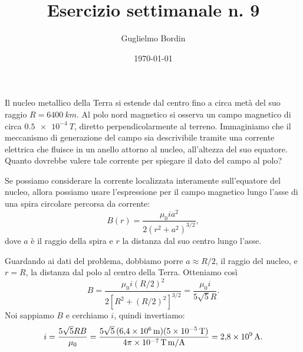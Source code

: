 \documentclass[10pt]{gulartcl}
\title{Esercizio settimanale n. 9}
\author{Guglielmo Bordin}
\date{\today}
\begin{document}
\maketitle 

\noindent
Il nucleo metallico della Terra si estende dal centro fino a circa metà del
suo raggio $R = \qty{6400}{km}$. Al polo nord magnetico si osserva un campo
magnetico di circa $\qty{0.5e-4}{T}$, diretto perpendicolarmente al
terreno. Immaginiamo che il meccanismo di generazione del campo sia
descrivibile tramite una corrente elettrica che fluisce in un anello
attorno al nucleo, all’altezza del suo equatore. Quanto dovrebbe valere
tale corrente per spiegare il dato del campo al polo?

\begin{solution}
Se possiamo considerare la corrente localizzata interamente sull’equatore
del nucleo, allora possiamo usare l’espressione per il campo magnetico
lungo l’asse di una spira circolare percorsa da corrente:
\begin{equation}
    B(r) = \frac{\mu_0 i a^2}{2(r^2 + a^2)^{3 / 2}},
\end{equation}
dove $a$ è il raggio della spira e $r$ la distanza dal suo centro lungo
l’asse.

Guardando ai dati del problema, dobbiamo porre $a \approx R / 2$, il
raggio del nucleo, e $r = R$, la distanza dal polo al centro della Terra.
Otteniamo così
\begin{equation}
    B = \frac{\mu_0 i (R / 2)^2}{2[R^2 + (R / 2)^2]^{3 / 2}}
      = \frac{\mu_0 i}{5 \sqrt{5} R}.
\end{equation}
Noi sappiamo $B$ e cerchiamo $i$, quindi invertiamo:
\begin{equation}
    i = \frac{5 \sqrt{5} R B}{\mu_0}
      = \frac{5 \sqrt{5} \, (\qty{6.4e6}{m})(\qty{5e-5}{T})}%
             {\qty{4\pi e-7}{T.m\per A}}
      = \qty{2.8e9}{A}.
\end{equation}
\end{solution}
\end{document}
